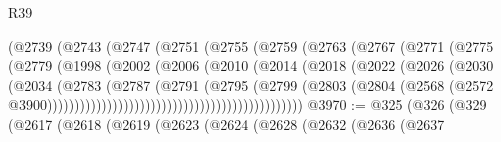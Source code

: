 \begin{lexlean}{R39}
\begin{coremodule}
                                      (@2739
                                        (@2743
                                          (@2747
                                            (@2751
                                              (@2755
                                                (@2759
                                                  (@2763
                                                    (@2767
                                                      (@2771
                                                        (@2775
                                                          (@2779
                                                            (@1998
                                                              (@2002
                                                                (@2006
                                                                  (@2010
                                                                    (@2014
                                                                      (@2018
                                                                        (@2022
                                                                          (@2026
                                                                            (@2030
                                                                              (@2034
                                                                                (@2783
                                                                                  (@2787
                                                                                    (@2791
                                                                                      (@2795
                                                                                        (@2799
                                                                                          (@2803
                                                                                            (@2804
                                                                                              (@2568
                                                                                                (@2572
                                                                                                  @3900)))))))))))))))))))))))))))))))))))))))))))))))
@3970 := @325
    (@326
      (@329
        (@2617
          (@2618
            (@2619
              (@2623
                (@2624
                  (@2628
                    (@2632
                      (@2636
                        (@2637

\end{coremodule}
\end{lexlean}
